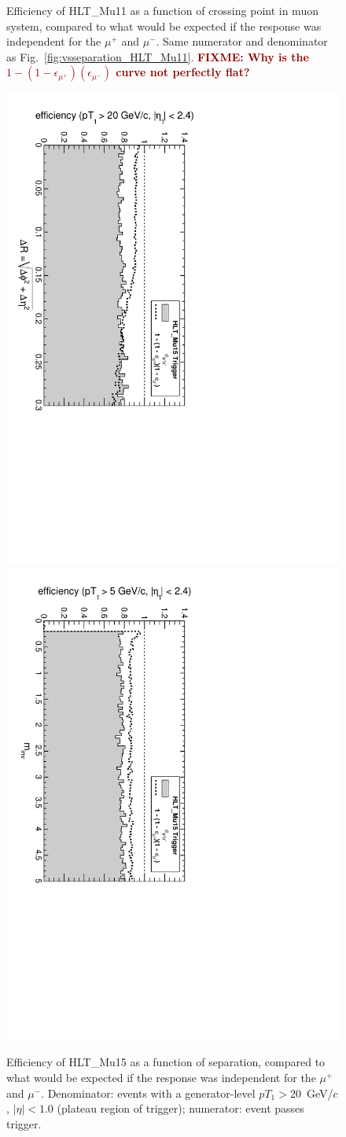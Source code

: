 \documentclass[12pt]{article}
\newcommand{\fixme}[1]{\textcolor{darkred}{\bf FIXME: #1}}
\begin{document}
\begin{figure}[p]
\caption{Efficiency of HLT\_Mu11 as a function of crossing point in
  muon system, compared to what would be expected if the response was
  independent for the $\mu^+$ and $\mu^-$.  Same numerator and
  denominator as Fig.~\ref{fig:vsseparation_HLT_Mu11}.  \fixme{Why is
    the $1 - (1 - \epsilon_{\mu^+})(\epsilon_{\mu^-})$ curve not
    perfectly flat?} \label{fig:vsmuonpos_HLT_Mu11}}
\end{figure}

\begin{figure}[p]
\includegraphics[height=0.5\linewidth, angle=90]{fig/acceptance6_plot/vsdR_HLT_Mu15.pdf}
\includegraphics[height=0.5\linewidth, angle=90]{fig/acceptance6_plot/vsmass_HLT_Mu15.pdf}

\caption{Efficiency of HLT\_Mu15 as a function of separation, compared to what would be expected if the response was independent for the $\mu^+$ and $\mu^-$.  Denominator: events with a
  generator-level $pT_1 > 20$~GeV/$c$, $|\eta| < 1.0$ (plateau region
  of trigger); numerator: event passes trigger. \label{fig:vsseparation_HLT_Mu15}}
\end{figure}
\end{document}
